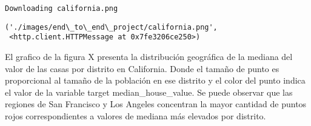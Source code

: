 \documentclass[11pt]{article}
\makeatletter
\newcommand{\boxspacing}{\kern\kvtcb@left@rule\kern\kvtcb@boxsep}
\newcommand{\prompt}[4]{
        {\ttfamily\llap{{\color{#2}[#3]:\hspace{3pt}#4}}\vspace{-\baselineskip}}
    }
\makeatother
\begin{document}
    \begin{Verbatim}[commandchars=\\\{\}]
Downloading california.png
    \end{Verbatim}

            \begin{tcolorbox}[breakable, size=fbox, boxrule=.5pt, pad at break*=1mm, opacityfill=0]
\prompt{Out}{outcolor}{7}{\boxspacing}
\begin{Verbatim}[commandchars=\\\{\}]
('./images/end\_to\_end\_project/california.png',
 <http.client.HTTPMessage at 0x7fe3206ce250>)
\end{Verbatim}
\end{tcolorbox}
        
    El grafico de la figura X presenta la distribución geográfica de la
mediana del valor de las casas por distrito en California. Donde el
tamaño de punto es proporcional al tamaño de la población en ese
distrito y el color del punto indica el valor de la variable target
median\_house\_value. Se puede observar que las regiones de San
Francisco y Los Angeles concentran la mayor cantidad de puntos rojos
correspondientes a valores de mediana más elevados por distrito.
\end{document}
